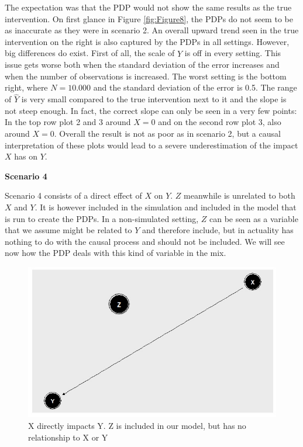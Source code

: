 \documentclass[
]{krantz}
\begin{document}
The expectation was that the PDP would not show the same results as the true intervention. On first glance in Figure \ref{fig:Figure8}, the PDPs do not seem to be as inaccurate as they were in scenario 2. An overall upward trend seen in the true intervention on the right is also captured by the PDPs in all settings. However, big differences do exist. First of all, the scale of \(\hat{Y}\) is off in every setting. This issue gets worse both when the standard deviation of the error increases and when the number of observations is increased. The worst setting is the bottom right, where \(N = 10.000\) and the standard deviation of the error is 0.5. The range of \(\hat{Y}\) is very small compared to the true intervention next to it and the slope is not steep enough. In fact, the correct slope can only be seen in a very few points: In the top row plot 2 and 3 around \(X=0\) and on the second row plot 3, also around \(X=0\).
Overall the result is not as poor as in scenario 2, but a causal interpretation of these plots would lead to a severe underestimation of the impact \(X\) has on \(Y\).

\textbf{Scenario 4}

Scenario 4 consists of a direct effect of \(X\) on \(Y\). \(Z\) meanwhile is unrelated to both \(X\) and \(Y\). It is however included in the simulation and included in the model that is run to create the PDPs. In a non-simulated setting, \(Z\) can be seen as a variable that we assume might be related to \(Y\) and therefore include, but in actuality has nothing to do with the causal process and should not be included. We will see now how the PDP deals with this kind of variable in the mix.

\begin{figure}

\includegraphics[width=1\linewidth]{images/scenario4} \hfill{}

\caption{X directly impacts Y. Z is included in our model, but has no relationship to X or Y}\label{fig:Figure9}
\end{figure}
\end{document}
